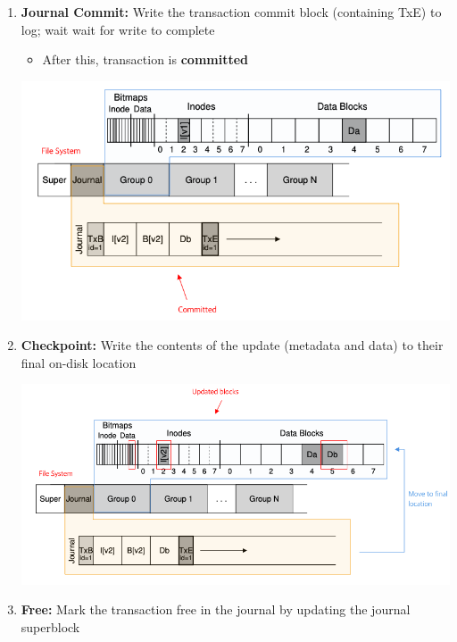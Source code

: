 \documentclass[12pt]{article}
\begin{document}
\begin{itemize}
\begin{enumerate}[1.]
        \item \textbf{Journal Commit:} Write the transaction commit block (containing TxE) to log; wait wait for write to complete
        \begin{itemize}
            \item After this, transaction is \textbf{committed}
        \end{itemize}

        \begin{center}
        \includegraphics[width=0.8\linewidth]{../images/midterm_4_solution_37.png}
        \end{center}

        \item \textbf{Checkpoint:} Write the contents of the update (metadata and data) to their final on-disk location

        \begin{center}
        \includegraphics[width=0.9\linewidth]{../images/midterm_4_solution_38.png}
        \end{center}

        \item \textbf{Free:} Mark the transaction free in the journal by updating the
        journal superblock


\end{enumerate}
\end{itemize}
\end{document}
